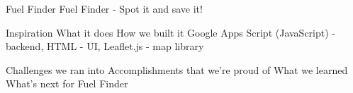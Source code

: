 Fuel Finder
Fuel Finder - Spot it and save it!

Inspiration
What it does
How we built it
Google Apps Script (JavaScript) - backend, HTML - UI, Leaflet.js - map library

Challenges we ran into
Accomplishments that we're proud of
What we learned
What's next for Fuel Finder
